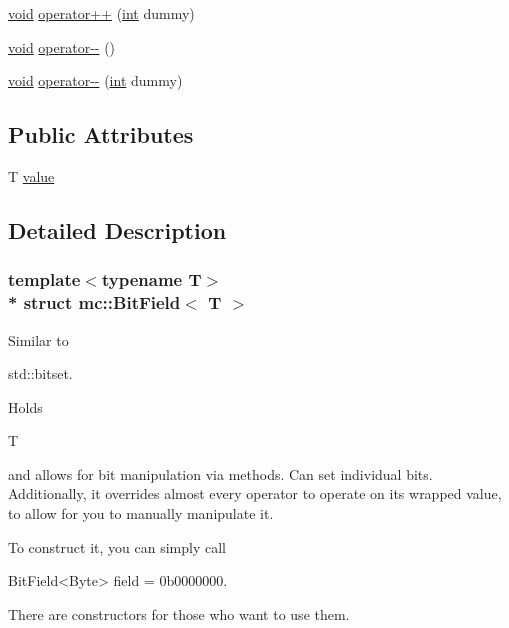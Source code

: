 \begin{DoxyCompactItemize}
\item 
\hyperlink{_s_d_l__opengles2__gl2ext_8h_ae5d8fa23ad07c48bb609509eae494c95}{void} \hyperlink{structmc_1_1_bit_field_a7d19ab9d46aba47b2c1ef87a5a61112e}{operator++} (\hyperlink{_s_d_l__thread_8h_a6a64f9be4433e4de6e2f2f548cf3c08e}{int} dummy)
\item 
\hyperlink{_s_d_l__opengles2__gl2ext_8h_ae5d8fa23ad07c48bb609509eae494c95}{void} \hyperlink{structmc_1_1_bit_field_a797e997d7cffa3d4dcc82679eb7a4326}{operator-\/-\/} ()
\item 
\hyperlink{_s_d_l__opengles2__gl2ext_8h_ae5d8fa23ad07c48bb609509eae494c95}{void} \hyperlink{structmc_1_1_bit_field_a82fafa3ed720f477b39f22bb841293f0}{operator-\/-\/} (\hyperlink{_s_d_l__thread_8h_a6a64f9be4433e4de6e2f2f548cf3c08e}{int} dummy)
\end{DoxyCompactItemize}
\subsection*{Public Attributes}
\begin{DoxyCompactItemize}
\item 
T \hyperlink{structmc_1_1_bit_field_ac4a96f98afd87fe71a7ad7c288e9e7d6}{value}
\end{DoxyCompactItemize}


\subsection{Detailed Description}
\subsubsection*{template$<$typename T$>$\\*
struct mc\+::\+Bit\+Field$<$ T $>$}

Similar to
\begin{DoxyCode}
std::bitset. 
\end{DoxyCode}
 Holds
\begin{DoxyCode}
T 
\end{DoxyCode}
 and allows for bit manipulation via methods. Can set individual bits. Additionally, it overrides almost every operator to operate on it\textquotesingle{}s wrapped value, to allow for you to manually manipulate it. 

To construct it, you can simply call
\begin{DoxyCode}
BitField<Byte> field = 0b0000000. 
\end{DoxyCode}
 There are constructors for those who want to use them. 

